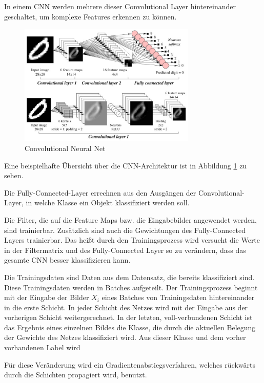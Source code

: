 In einem CNN werden mehrere dieser Convolutional Layer hintereinander geschaltet, um komplexe Features erkennen zu können. 
\begin{figure}[H]
  \centering
  \includegraphics[width=0.75\textwidth]{images/cnn.pdf}
  \caption{Convolutional Neural Net \cite{CNNImg}}
  \label{fig:cnn}
\end{figure}



Eine beispielhafte Übersicht über die CNN-Architektur ist in Abbildung \ref{fig:cnn} zu sehen.

Die Fully-Connected-Layer errechnen aus den Ausgängen der Convolutional-Layer, in welche Klasse ein Objekt klassifiziert werden soll.

Die Filter, die auf die Feature Maps bzw. die Eingabebilder angewendet werden, sind trainierbar. Zusätzlich sind auch die Gewichtungen des Fully-Connected Layers trainierbar. Das heißt durch den Trainingsprozess wird versucht die Werte in der Filtermatrix und des Fully-Connected Layer so zu verändern, dass das gesamte CNN besser klassifizieren kann. 
\color{blue1}

Die Trainingsdaten sind Daten aus dem Datensatz, die bereits klassifiziert sind. Diese Trainingsdaten werden in Batches aufgeteilt. Der Trainingsprozess beginnt mit der Eingabe der Bilder $X_i$ eines Batches von Trainingsdaten hintereinander in die erste Schicht. In jeder Schicht des Netzes wird mit der Eingabe aus der vorherigen Schicht weitergerechnet. In der letzten, voll-verbundenen Schicht ist das Ergebnis eines einzelnen Bildes die Klasse, die durch die aktuellen Belegung der Gewichte des Netzes klassifiziert wird. Aus dieser Klasse und dem vorher vorhandenen Label wird




\color{black}
Für diese Veränderung wird ein Gradientenabstiegsverfahren, welches rückwärts durch die Schichten propagiert wird, benutzt.


